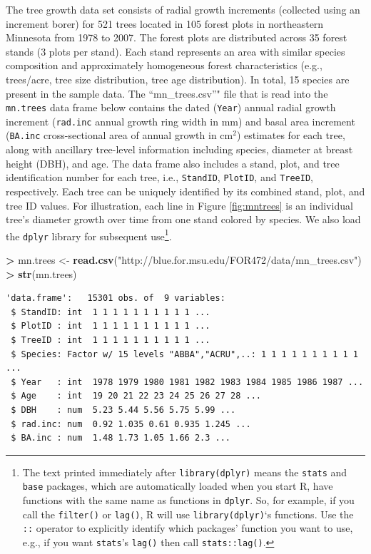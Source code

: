 \documentclass[]{krantz}
\makeatletter
\newenvironment{Shaded}{\begin{snugshade}}{\end{snugshade}}
\newcommand{\KeywordTok}[1]{\textcolor[rgb]{0.27,0.27,0.27}{\textbf{#1}}}
\newcommand{\NormalTok}[1]{#1}
\newcommand{\OperatorTok}[1]{\textcolor[rgb]{0.43,0.43,0.43}{\textbf{#1}}}
\newcommand{\StringTok}[1]{\textcolor[rgb]{0.5,0.5,0.5}{#1}}
\newenvironment{kframe}{%
\medskip{}
\setlength{\fboxsep}{.8em}
 \def\at@end@of@kframe{}%
 \ifinner\ifhmode%
  \def\at@end@of@kframe{\end{minipage}}%
  \begin{minipage}{\columnwidth}%
 \fi\fi%
 \def\FrameCommand##1{\hskip\@totalleftmargin \hskip-\fboxsep
 \colorbox{shadecolor}{##1}\hskip-\fboxsep
     \hskip-\linewidth \hskip-\@totalleftmargin \hskip\columnwidth}%
 \MakeFramed {\advance\hsize-\width
   \@totalleftmargin\z@ \linewidth\hsize
   \@setminipage}}%
 {\par\unskip\endMakeFramed%
 \at@end@of@kframe}
\renewenvironment{Shaded}{\begin{kframe}}{\end{kframe}}
\makeatother
\begin{document}
The tree growth data set consists of radial growth increments (collected using an increment borer) for 521 trees located in 105 forest plots in northeastern Minnesota from 1978 to 2007. The forest plots are distributed across 35 forest stands (3 plots per stand). Each stand represents an area with similar species composition and approximately homogeneous forest characteristics (e.g., trees/acre, tree size distribution, tree age distribution). In total, 15 species are present in the sample data. The ``mn\_trees.csv''" file that is read into the \texttt{mn.trees} data frame below contains the dated (\texttt{Year}) annual radial growth increment (\texttt{rad.inc} annual growth ring width in mm) and basal area increment (\texttt{BA.inc} cross-sectional area of annual growth in cm\(^2\)) estimates for each tree, along with ancillary tree-level information including species, diameter at breast height (DBH), and age. The data frame also includes a stand, plot, and tree identification number for each tree, i.e., \texttt{StandID}, \texttt{PlotID}, and \texttt{TreeID}, respectively. Each tree can be uniquely identified by its combined stand, plot, and tree ID values. For illustration, each line in Figure \ref{fig:mntrees} is an individual tree's diameter growth over time from one stand colored by species. We also load the \texttt{dplyr} library for subsequent use\footnote{The text printed immediately after \texttt{library(dplyr)} means the \texttt{stats} and \texttt{base} packages, which are automatically loaded when you start R, have functions with the same name as functions in \texttt{dplyr}. So, for example, if you call the \texttt{filter()} or \texttt{lag()}, R will use \texttt{library(dplyr)}`s functions. Use the \texttt{::} operator to explicitly identify which packages' function you want to use, e.g., if you want \texttt{stats}'s \texttt{lag()} then call \texttt{stats::lag()}.}.

\begin{Shaded}
\begin{Highlighting}[]
\OperatorTok{>}\StringTok{ }\NormalTok{mn.trees <-}\StringTok{ }\KeywordTok{read.csv}\NormalTok{(}\StringTok{"http://blue.for.msu.edu/FOR472/data/mn_trees.csv"}\NormalTok{)}
\OperatorTok{>}\StringTok{ }\KeywordTok{str}\NormalTok{(mn.trees)}
\end{Highlighting}
\end{Shaded}

\begin{verbatim}
'data.frame':   15301 obs. of  9 variables:
 $ StandID: int  1 1 1 1 1 1 1 1 1 1 ...
 $ PlotID : int  1 1 1 1 1 1 1 1 1 1 ...
 $ TreeID : int  1 1 1 1 1 1 1 1 1 1 ...
 $ Species: Factor w/ 15 levels "ABBA","ACRU",..: 1 1 1 1 1 1 1 1 1 1 ...
 $ Year   : int  1978 1979 1980 1981 1982 1983 1984 1985 1986 1987 ...
 $ Age    : int  19 20 21 22 23 24 25 26 27 28 ...
 $ DBH    : num  5.23 5.44 5.56 5.75 5.99 ...
 $ rad.inc: num  0.92 1.035 0.61 0.935 1.245 ...
 $ BA.inc : num  1.48 1.73 1.05 1.66 2.3 ...
\end{verbatim}
\end{document}
